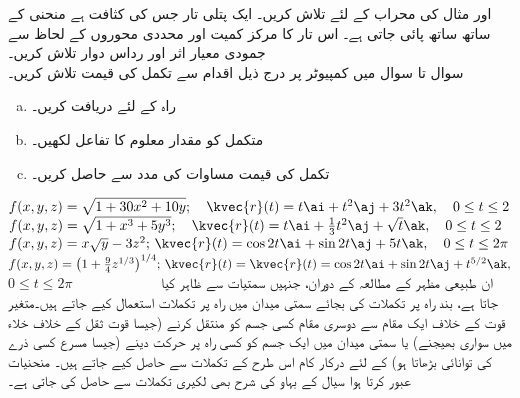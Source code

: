 %
 اور  مثال  کی محراب کے لئے تلاش کریں۔
%
ایک پتلی تار جس کی کثافت  ہے منحنی  کے ساتھ ساتھ پائی جاتی ہے۔ اس تار کا مرکز کمیت اور محددی محوروں کے لحاظ سے جمودی معیار اثر اور رداس دوار تلاش کریں۔
\\
سوال  تا سوال  میں کمپیوٹر پر درج ذیل اقدام سے تکمل کی قیمت تلاش کریں۔
\begin{enumerate}[a.]
\item
راہ  کے لئے  دریافت کریں۔
\item
متکمل  کو مقدار معلوم  کا تفاعل لکھیں۔
\item
تکمل  کی قیمت مساوات  کی مدد سے حاصل  کریں۔ 
\end{enumerate}
%
\(f(x,y,z)=\sqrt{1+30x^2+10y};\quad \kvec{r}(t)=t\ai+t^2\aj+3t^2\ak,\quad 0\le t\le 2\)
%
\(f(x,y,z)=\sqrt{1+x^3+5y^3};\quad \kvec{r}(t)=t\ai+\frac{1}{3}t^2\aj+\sqrt{t}\ak,\quad 0\le t\le 2\)
%
\(f(x,y,z)=x\sqrt{y}-3z^2;\,\kvec{r}(t)=\cos 2t \ai+\sin 2t\aj+5t\ak,\quad 0\le t\le 2\pi\)
%
\(f(x,y,z)=\big(1+\frac{9}{4}z^{1/3}\big)^{1/4};\, \kvec{r}(t)=\kvec{r}(t)=\cos 2t \ai+\sin 2t\aj+t^{5/2}\ak,\)\\
\( 0\le t\le 2\pi\quad\quad\quad\quad\quad\quad\)
ان طبیعی  مظہر  کے مطالعہ کے دوران، جنہیں سمتیات سے ظاہر کیا جاتا ہے، بند راہ پر تکملات کی بجائے سمتی میدان میں راہ پر تکملات استعمال کیے جاتے ہیں۔متغیر قوت کے خلاف ایک مقام سے دوسری مقام کسی جسم کو منتقل کرنے (جیسا قوت ثقل کے خلاف خلاء میں سواری بھیجنے)   یا سمتی میدان میں ایک جسم کو کسی راہ پر حرکت دینے (جیسا مسرع کسی ذرے کی توانائی بڑھاتا ہو)  کے لئے درکار کام   اس طرح کے تکملات سے حاصل کیے  جاتے ہیں۔  منحنیات عبور کرتا ہوا سیال کے بہاو کی شرح بھی لکیری تکملات سے حاصل کی جاتی ہے۔

